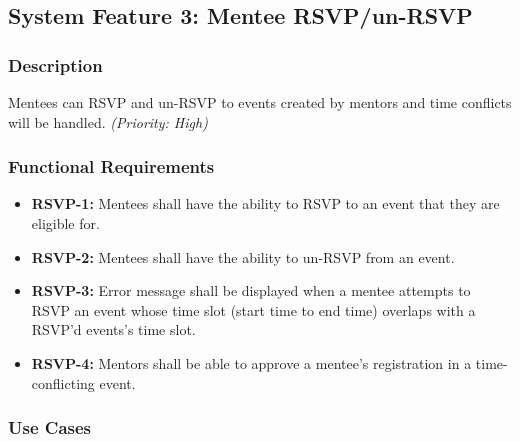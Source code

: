 \subsection{System Feature 3: Mentee RSVP/un-RSVP} 


\subsubsection{Description}
Mentees can RSVP and un-RSVP to events created by mentors and time conflicts
will be handled.
\textit{(Priority: High)}



\subsubsection{Functional Requirements}
\begin{itemize}[label=$\bullet$]
    \item \textbf{RSVP-1:} Mentees shall have the ability to RSVP to an event
    that they are eligible for.
    
    \item \textbf{RSVP-2:} Mentees shall have the ability to un-RSVP from an
    event.
    
    \item \textbf{RSVP-3:} Error message shall be displayed when a mentee
    attempts to RSVP an event whose time slot (start time to end time) overlaps
    with a RSVP'd events's time slot.
    
    \item \textbf{RSVP-4:} Mentors shall be able to approve a mentee's
    registration in a time-conflicting event.
\end{itemize}



\subsubsection{Use Cases}

